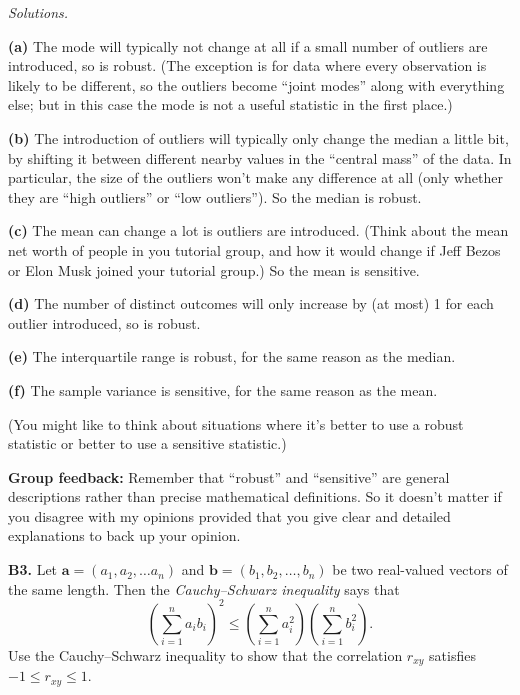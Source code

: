 \documentclass[
  a4paper,
]{book}
\theoremstyle{definition}
\theoremstyle{definition}
\theoremstyle{definition}
\theoremstyle{definition}
\theoremstyle{remark}
\begin{document}
\begin{myanswers}
\emph{Solutions.}

\textbf{(a)} The mode will typically not change at all if a small number of outliers are introduced, so is robust. (The exception is for data where every observation is likely to be different, so the outliers become ``joint modes'' along with everything else; but in this case the mode is not a useful statistic in the first place.)

\textbf{(b)} The introduction of outliers will typically only change the median a little bit, by shifting it between different nearby values in the ``central mass'' of the data. In particular, the size of the outliers won't make any difference at all (only whether they are ``high outliers'' or ``low outliers''). So the median is robust.

\textbf{(c)} The mean can change a lot is outliers are introduced. (Think about the mean net worth of people in you tutorial group, and how it would change if Jeff Bezos or Elon Musk joined your tutorial group.) So the mean is sensitive.

\textbf{(d)} The number of distinct outcomes will only increase by (at most) 1 for each outlier introduced, so is robust.

\textbf{(e)} The interquartile range is robust, for the same reason as the median.

\textbf{(f)} The sample variance is sensitive, for the same reason as the mean.

(You might like to think about situations where it's better to use a robust statistic or better to use a sensitive statistic.)

\textbf{Group feedback:} Remember that ``robust'' and ``sensitive'' are general descriptions rather than precise mathematical definitions. So it doesn't matter if you disagree with my opinions provided that you give clear and detailed explanations to back up your opinion.

\end{myanswers}

\textbf{B3.} Let \(\mathbf a = (a_1, a_2, \dots a_n)\) and \(\mathbf b = (b_1, b_2, \dots, b_n)\) be two real-valued vectors of the same length. Then the \emph{Cauchy--Schwarz inequality} says that
\[ \left( \sum_{i=1}^n a_i b_i \right)^2 \leq \left( \sum_{i=1}^n a_i^2 \right) \left(\sum_{i=1}^n b_i^2 \right) . \]
Use the Cauchy--Schwarz inequality to show that the correlation \(r_{xy}\) satisfies \(-1 \leq r_{xy} \leq 1\).
\end{document}
